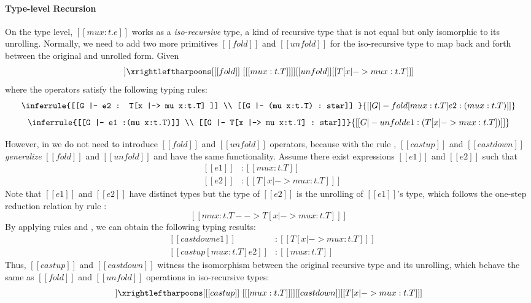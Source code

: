 \paragraph{Type-level Recursion}

On the type level, $[[mu x:t.e]]$ works as a \emph{iso-recursive}
type, a kind of recursive type that is not equal but only isomorphic
to its unrolling. Normally, we need to add two more primitives
$[[fold]]$ and $[[unfold]]$ for the iso-recursive type to map back
and forth between the original and unrolled form. Given 
\begin{align*}
  [[mu x:t.T]] \xrightleftharpoons[{[[fold]]~[ [[mu x:t.T]] ]}]
  {[[unfold]]} [[T[x |-> mu x:t.T] ]]
\end{align*}
where the operators satisfy the following typing rules:
\[ \inferrule{[[G |- e2 : T[x |-> mu x:t.T] ]] \\ [[G |- (mu x:t.T) : star]] }
   {[[G |- fold [mu x:t.T] e2 : (mu x:t.T) ]]} \]
\[ \inferrule{[[G |- e1 :(mu x:t.T)]] \\ [[G |- T[x |-> mu x:t.T] : star]]}
   {[[G |- unfold e1 : (T[x |-> mu x:t.T]) ]]} \]

However, in \name we do not need to introduce $[[fold]]$ and
$[[unfold]]$ operators, because with the rule ,
$[[castup]]$ and $[[castdown]]$ \emph{generalize} $[[fold]]$ and
$[[unfold]]$ and have the same functionality. Assume there exist
expressions $[[e1]]$ and $[[e2]]$ such that
\[\begin{array}{lll}
	&[[e1]] &: [[mu x:t.T]]\\
	&[[e2]] &: [[T [x |-> mu x:t.T] ]]
\end{array}\]
Note that $[[e1]]$ and $[[e2]]$ have distinct types but the type of
$[[e2]]$ is the unrolling of $[[e1]]$'s type, which follows the
one-step reduction relation by rule :
\[ [[mu x:t.T --> T [x |-> mu x:t.T] ]] \]
By applying rules  and , we
can obtain the following typing results:
\[\begin{array}{lll}
	&[[castdown e1]] &: [[T [x |-> mu x:t.T] ]]\\
	&[[castup [mu x:t.T] e2]] &: [[mu x:t.T]]
\end{array}\]
Thus, $[[castup]]$ and $[[castdown]]$ witness the isomorphism between
the original recursive type and its unrolling, which behave the same
as $[[fold]]$ and $[[unfold]]$ operations in iso-recursive types:
\begin{align*}
  [[mu x:t.T]] \xrightleftharpoons[{[[castup]]~[ [[mu x:t.T]]
  ]}]{[[castdown]]} [[T[x |-> mu x:t.T] ]]
\end{align*}


